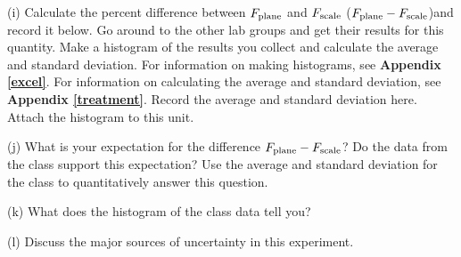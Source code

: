 (i) Calculate the percent difference between \( F_{\rm plane} \) and \( F_{\rm scale} \) (\( F_{\rm plane} - F_{\rm scale} \))and record it below.
Go around to the other lab groups and get their results for this quantity.
Make a histogram of the results you collect and calculate the average and standard deviation.
For information on making histograms, see \textbf{Appendix \ref{excel}}. For information on calculating the average and
standard deviation, see \textbf{Appendix \ref{treatment}}. Record the average and standard deviation here.
Attach the histogram to this unit.
\vspace{30mm}

(j) What is your expectation for the difference \( F_{\rm plane} - F_{\rm scale} \)?
Do the data from the class support this expectation? 
Use the average and standard deviation for the class to quantitatively answer this question.
\vspace{20mm}

(k) What does the histogram of the class data tell you?
\vspace{20mm}

(l) Discuss the major sources of uncertainty in this experiment.
\vspace{15mm}

